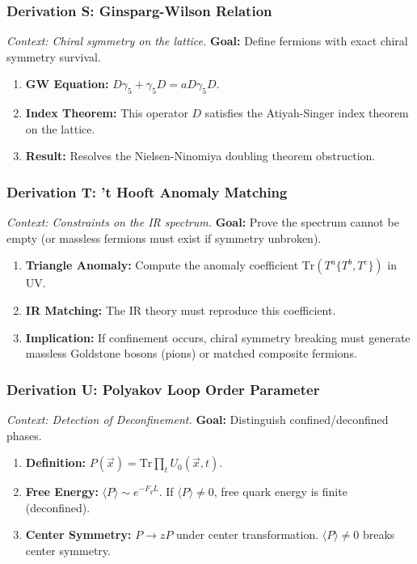 \subsubsection{Derivation S: Ginsparg-Wilson Relation}
\textit{Context: Chiral symmetry on the lattice.}
\textbf{Goal:} Define fermions with exact chiral symmetry survival.
\begin{enumerate}
    \item \textbf{GW Equation:} $D \gamma_5 + \gamma_5 D = a D \gamma_5 D$.
    \item \textbf{Index Theorem:} This operator $D$ satisfies the Atiyah-Singer index theorem on the lattice.
    \item \textbf{Result:} Resolves the Nielsen-Ninomiya doubling theorem obstruction.
\end{enumerate}

\subsubsection{Derivation T: 't Hooft Anomaly Matching}
\textit{Context: Constraints on the IR spectrum.}
\textbf{Goal:} Prove the spectrum cannot be empty (or massless fermions must exist if symmetry unbroken).
\begin{enumerate}
    \item \textbf{Triangle Anomaly:} Compute the anomaly coefficient $\text{Tr}(T^a \{T^b, T^c\})$ in UV.
    \item \textbf{IR Matching:} The IR theory must reproduce this coefficient.
    \item \textbf{Implication:} If confinement occurs, chiral symmetry breaking must generate massless Goldstone bosons (pions) or matched composite fermions.
\end{enumerate}

\subsubsection{Derivation U: Polyakov Loop Order Parameter}
\textit{Context: Detection of Deconfinement.}
\textbf{Goal:} Distinguish confined/deconfined phases.
\begin{enumerate}
    \item \textbf{Definition:} $P(\vec{x}) = \text{Tr} \prod_t U_0(\vec{x}, t)$.
    \item \textbf{Free Energy:} $\langle P \rangle \sim e^{-F_q L}$. If $\langle P \rangle \neq 0$, free quark energy is finite (deconfined).
    \item \textbf{Center Symmetry:} $P \to z P$ under center transformation. $\langle P \rangle \neq 0$ breaks center symmetry.
\end{enumerate}

